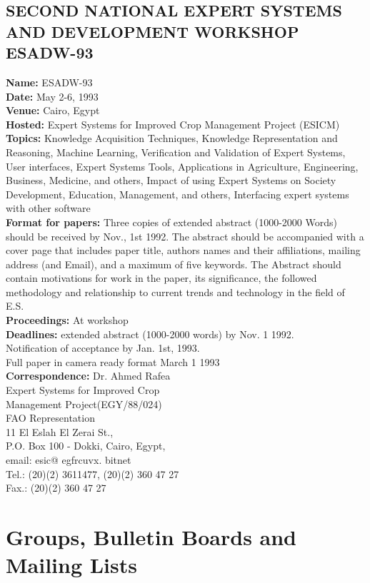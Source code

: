 \subsection{SECOND NATIONAL EXPERT SYSTEMS AND DEVELOPMENT WORKSHOP ESADW-93}
{\bf Name:} ESADW-93\\
{\bf Date:} May 2-6, 1993\\
{\bf Venue:} Cairo, Egypt\\
{\bf Hosted:} Expert Systems for Improved Crop Management Project (ESICM)
{\bf Topics:} Knowledge Acquisition Techniques, Knowledge
Representation and Reasoning, Machine Learning, Verification and
Validation of Expert Systems, User interfaces, Expert Systems Tools,
Applications in Agriculture, Engineering, Business, Medicine, and
others, Impact of using Expert Systems on Society Development,
Education, Management, and  others, Interfacing expert systems with
other software \\
{\bf Format for papers:} Three  copies of extended abstract (1000-2000 Words)
should be received by Nov., 1st 1992. The abstract should be
accompanied with a cover page that includes paper title, authors names
and their affiliations, mailing address (and Email), and a maximum of
five keywords. The Abstract should contain motivations for work in the
paper, its significance, the followed methodology and relationship to
current trends and technology in the field of E.S.\\ 
{\bf Proceedings:} At workshop\\
{\bf Deadlines:} extended abstract (1000-2000 words) by Nov. 1 1992.\\
Notification of acceptance by Jan. 1st, 1993.\\
Full paper in camera ready format March 1 1993\\
{\bf Correspondence:}
Dr. Ahmed Rafea\\
Expert Systems for Improved Crop\\
Management Project(EGY/88/024)\\
FAO  Representation\\
11 El Eslah El Zerai St.,\\
P.O. Box 100 - Dokki, Cairo, Egypt,\\
email: esic@ egfrcuvx. bitnet\\
Tel.:    (20)(2) 3611477, (20)(2) 360 47 27\\
Fax.: (20)(2) 360 47 27\\

\section{Groups, Bulletin Boards and Mailing Lists}
